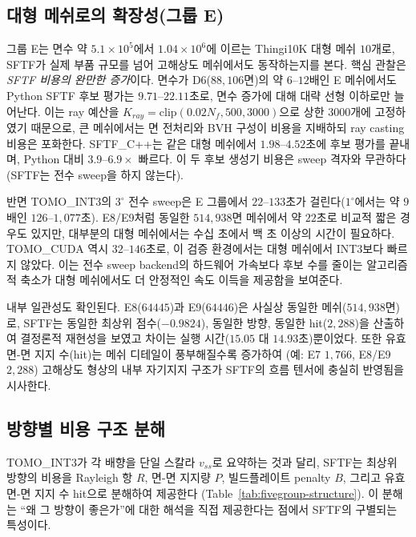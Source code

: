 \documentclass[11pt,a4paper]{article}
\begin{document}
\subsection{대형 메쉬로의 확장성(그룹 E)}
\label{sec:groupE}

그룹 E는 면수 약 $5.1\times10^5$에서 $1.04\times10^6$에 이르는 Thingi10K 대형 메쉬 $10$개로,
SFTF가 실제 부품 규모를 넘어 고해상도 메쉬에서도 동작하는지를 본다.
핵심 관찰은 \emph{SFTF 비용의 완만한 증가}이다.
면수가 D6($88{,}106$면)의 약 $6$--$12$배인 E 메쉬에서도 Python SFTF 후보 평가는 $9.71$--$22.11$초로,
면수 증가에 대해 대략 선형 이하로만 늘어난다.
이는 ray 예산을 $K_{ray}=\mathrm{clip}(0.02N_f,500,3000)$으로 상한 $3000$개에 고정하였기 때문으로,
큰 메쉬에서는 면 전처리와 BVH 구성이 비용을 지배하되 ray casting 비용은 포화한다.
SFTF\_C++는 같은 대형 메쉬에서 $1.98$--$4.52$초에 후보 평가를 끝내며,
Python 대비 $3.9$--$6.9\times$ 빠르다.
이 두 후보 생성기 비용은 sweep 격자와 무관하다(SFTF는 전수 sweep을 하지 않는다).

반면 TOMO\_INT3의 $3^\circ$ 전수 sweep은 E 그룹에서 $22$--$133$초가 걸린다($1^\circ$에서는 약 $9$배인 $126$--$1{,}077$초).
E8/E9처럼 동일한 $514{,}938$면 메쉬에서 약 $22$초로 비교적 짧은 경우도 있지만,
대부분의 대형 메쉬에서는 수십 초에서 백 초 이상의 시간이 필요하다.
TOMO\_CUDA 역시 $32$--$146$초로, 이 검증 환경에서는 대형 메쉬에서 INT3보다 빠르지 않았다.
이는 전수 sweep backend의 하드웨어 가속보다 후보 수를 줄이는 알고리즘적 축소가
대형 메쉬에서도 더 안정적인 속도 이득을 제공함을 보여준다.

내부 일관성도 확인된다.
E8($64445$)과 E9($64446$)은 사실상 동일한 메쉬($514{,}938$면)로,
SFTF는 동일한 최상위 점수($-0.9824$), 동일한 방향, 동일한 hit($2{,}288$)을 산출하여
결정론적 재현성을 보였고 차이는 실행 시간($15.05$ 대 $14.93$초)뿐이었다.
또한 유효 면-면 지지 수(hit)는 메쉬 디테일이 풍부해질수록 증가하여
(예: E7 $1{,}766$, E8/E9 $2{,}288$) 고해상도 형상의 내부 자기지지 구조가
SFTF의 흐름 텐서에 충실히 반영됨을 시사한다.

\subsection{방향별 비용 구조 분해}

TOMO\_INT3가 각 배향을 단일 스칼라 $v_{ss}$로 요약하는 것과 달리,
SFTF는 최상위 방향의 비용을 Rayleigh 항 $R$, 면-면 지지량 $P$,
빌드플레이트 penalty $B$, 그리고 유효 면-면 지지 수 hit으로 분해하여 제공한다
(Table~\ref{tab:fivegroup-structure}).
이 분해는 ``왜 그 방향이 좋은가''에 대한 해석을 직접 제공한다는 점에서
SFTF의 구별되는 특성이다.
\end{document}
